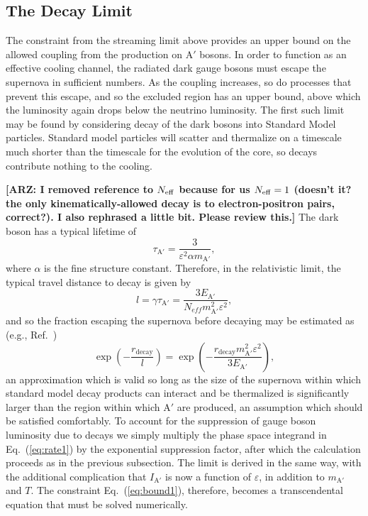 \documentclass[nofootinbib,prd,superscriptaddress,twocolumn]{revtex4}
\newcommand{\beq}{\begin{equation}}
\newcommand{\eeq}{\end{equation}}
\newcommand{\Aprime}{\mathrm{A}'}
\newcommand{\arz}[1]{{{\bf{\color{BrickRed}[ARZ: #1]}}}}
\begin{document}
\subsection{The Decay Limit}

The constraint from the streaming limit above provides an upper bound on the allowed coupling 
from the production on $\Aprime$ bosons. In order to function as an effective cooling channel, the 
radiated dark gauge bosons must escape the supernova in sufficient numbers. 
As the coupling increases, so do processes that prevent this escape, 
and so the excluded region has an upper bound, above which the luminosity again drops below the 
neutrino luminosity. The first such limit may be found by considering decay of the dark bosons 
into Standard Model particles. Standard model particles will scatter and thermalize 
on a timescale much shorter than the timescale for the evolution of the core, so decays 
contribute nothing to the cooling. 

\arz{I removed reference to $N_{\rm eff}$ because for us $N_{\rm eff}=1$ (doesn't it? the 
only kinematically-allowed decay is to electron-positron pairs, correct?). I also rephrased a 
little bit. Please review this.}
The dark boson has a typical lifetime of
\begin{equation}
\tau_{\mathrm{A}'} = \frac{3}{\varepsilon^2 \alpha m_{\mathrm{A}'}},
\end{equation}
where $\alpha$ is the fine structure constant. Therefore, in the relativistic limit, 
the typical travel distance to decay is given by 
%
\beq
\label{eq:decaylength}
l = \gamma \tau_{\mathrm{A}'} = \frac{3 E_{\mathrm{A}'}}{N_{eff} m_{\mathrm{A}'}^2 \varepsilon^2},
\eeq
and so the fraction escaping the supernova before decaying may be estimated as (e.g., Ref.~\cite{bjorken_etal09})
\beq
\label{eq:decayfactor}
\exp \left( - \frac{r_{\mathrm{decay}}}{l} \right) = 
\exp \left( - \frac{r_{\mathrm{decay}} m_{\mathrm{A}'}^2 \varepsilon^2}{3 E_{\mathrm{A}'}} \right),
\eeq
%
an approximation which is valid so long as the size of the supernova within which standard model decay 
products can interact and be thermalized is significantly larger than the region within which $\Aprime$ are produced, 
an assumption which should be satisfied comfortably. 
To account for the suppression of gauge boson luminosity due to decays we simply multiply the phase space 
integrand in Eq.~(\ref{eq:rate1}) by the exponential suppression factor, after which the calculation proceeds 
as in the previous subsection. The limit is derived in the same way, 
with the additional complication that $I_{\mathrm{A}'}$ is now a function of $\varepsilon $, in addition to $m_{\mathrm{A}'}$ and $T$. 
The constraint Eq.~(\ref{eq:bound1}), therefore, becomes a transcendental equation that must be solved numerically. 
\end{document}
